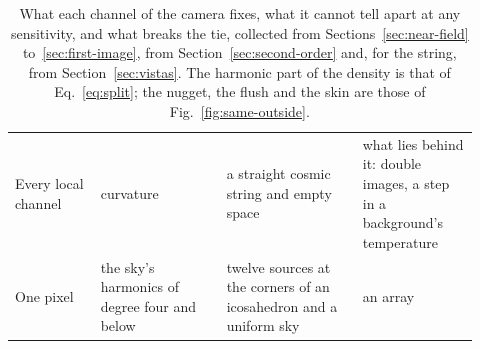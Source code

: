 \begin{table}
\begin{tabular}{p{0.17\linewidth}p{0.25\linewidth}p{0.27\linewidth}p{0.23\linewidth}}
Every local channel & curvature & a straight cosmic string and empty space & what lies behind it: double images, a step in a background's temperature \\
One pixel & the sky's harmonics of degree four and below & twelve sources at the corners of an icosahedron and a uniform sky & an array \\
\end{tabular}
\caption{What each channel of the camera fixes, what it cannot tell apart at
any sensitivity, and what breaks the tie, collected from
Sections~\ref{sec:near-field} to~\ref{sec:first-image}, from
Section~\ref{sec:second-order} and, for the string, from Section~\ref{sec:vistas}. The harmonic part of
the density is that of Eq.~\eqref{eq:split}; the nugget, the flush and the skin
are those of Fig.~\ref{fig:same-outside}.}\label{tab:null}
\end{table}
